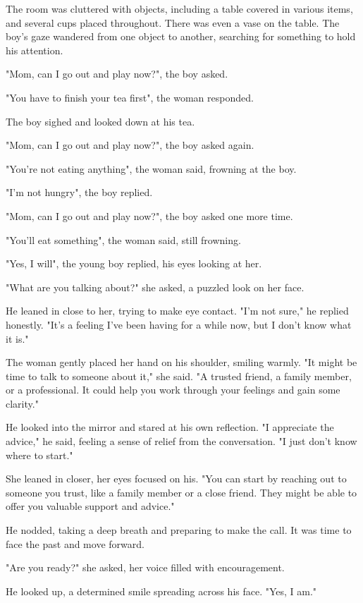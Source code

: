 \documentclass[smalldemyvopaper,11pt,twoside,onecolumn,openright,extrafontsizes]{memoir}
\begin{document}
The room was cluttered with objects, including a table covered in various items, and several cups placed throughout. There was even a vase on the table. The boy's gaze wandered from one object to another, searching for something to hold his attention.\par
"Mom, can I go out and play now?", the boy asked.\par
"You have to finish your tea first", the woman responded.\par
The boy sighed and looked down at his tea.\par
"Mom, can I go out and play now?", the boy asked again.\par
"You're not eating anything", the woman said, frowning at the boy.\par
"I'm not hungry", the boy replied.\par
"Mom, can I go out and play now?", the boy asked one more time.\par
"You'll eat something", the woman said, still frowning.\par
"Yes, I will", the young boy replied, his eyes looking at her.\par
"What are you talking about?" she asked, a puzzled look on her face.\par
He leaned in close to her, trying to make eye contact. "I'm not sure," he replied honestly. "It's a feeling I've been having for a while now, but I don't know what it is."\par
The woman gently placed her hand on his shoulder, smiling warmly. "It might be time to talk to someone about it," she said. "A trusted friend, a family member, or a professional. It could help you work through your feelings and gain some clarity."\par
He looked into the mirror and stared at his own reflection. "I appreciate the advice," he said, feeling a sense of relief from the conversation. "I just don't know where to start."\par
She leaned in closer, her eyes focused on his. "You can start by reaching out to someone you trust, like a family member or a close friend. They might be able to offer you valuable support and advice."\par
He nodded, taking a deep breath and preparing to make the call. It was time to face the past and move forward.\par
"Are you ready?" she asked, her voice filled with encouragement.\par
He looked up, a determined smile spreading across his face. "Yes, I am."\par
\end{document}
